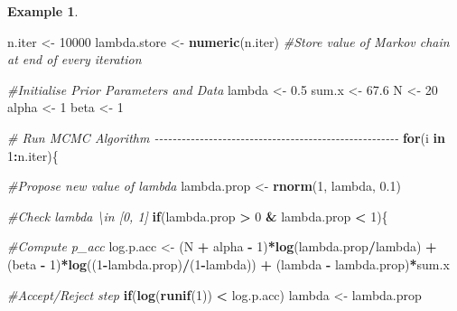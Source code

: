 \documentclass[
]{book}
\newenvironment{Shaded}{\begin{snugshade}}{\end{snugshade}}
\newcommand{\CommentTok}[1]{\textcolor[rgb]{0.56,0.35,0.01}{\textit{#1}}}
\newcommand{\ControlFlowTok}[1]{\textcolor[rgb]{0.13,0.29,0.53}{\textbf{#1}}}
\newcommand{\DecValTok}[1]{\textcolor[rgb]{0.00,0.00,0.81}{#1}}
\newcommand{\FloatTok}[1]{\textcolor[rgb]{0.00,0.00,0.81}{#1}}
\newcommand{\FunctionTok}[1]{\textcolor[rgb]{0.13,0.29,0.53}{\textbf{#1}}}
\newcommand{\NormalTok}[1]{#1}
\newcommand{\OtherTok}[1]{\textcolor[rgb]{0.56,0.35,0.01}{#1}}
\newcommand{\SpecialCharTok}[1]{\textcolor[rgb]{0.81,0.36,0.00}{\textbf{#1}}}
\theoremstyle{definition}
\theoremstyle{definition}
\newtheorem{example}{Example}[chapter]
\theoremstyle{definition}
\theoremstyle{definition}
\theoremstyle{remark}
\begin{document}
\begin{example}
\begin{Shaded}
\begin{Highlighting}[]
\NormalTok{n.iter }\OtherTok{\textless{}{-}} \DecValTok{10000}
\NormalTok{lambda.store }\OtherTok{\textless{}{-}} \FunctionTok{numeric}\NormalTok{(n.iter) }\CommentTok{\#Store value of Markov chain at end of every iteration}

\CommentTok{\#Initialise Prior Parameters and Data}
\NormalTok{lambda }\OtherTok{\textless{}{-}} \FloatTok{0.5}
\NormalTok{sum.x }\OtherTok{\textless{}{-}} \FloatTok{67.6}
\NormalTok{N }\OtherTok{\textless{}{-}} \DecValTok{20}
\NormalTok{alpha }\OtherTok{\textless{}{-}} \DecValTok{1}
\NormalTok{beta }\OtherTok{\textless{}{-}} \DecValTok{1}


\CommentTok{\# Run MCMC Algorithm {-}{-}{-}{-}{-}{-}{-}{-}{-}{-}{-}{-}{-}{-}{-}{-}{-}{-}{-}{-}{-}{-}{-}{-}{-}{-}{-}{-}{-}{-}{-}{-}{-}{-}{-}{-}{-}{-}{-}{-}{-}{-}{-}{-}{-}{-}{-}{-}{-}{-}{-}{-}{-}{-}}
\ControlFlowTok{for}\NormalTok{(i }\ControlFlowTok{in} \DecValTok{1}\SpecialCharTok{:}\NormalTok{n.iter)\{}
  
  \CommentTok{\#Propose new value of lambda}
\NormalTok{  lambda.prop }\OtherTok{\textless{}{-}} \FunctionTok{rnorm}\NormalTok{(}\DecValTok{1}\NormalTok{, lambda, }\FloatTok{0.1}\NormalTok{)}
  
  \CommentTok{\#Check lambda \textbackslash{}in [0, 1]}
  \ControlFlowTok{if}\NormalTok{(lambda.prop }\SpecialCharTok{\textgreater{}} \DecValTok{0} \SpecialCharTok{\&}\NormalTok{ lambda.prop }\SpecialCharTok{\textless{}} \DecValTok{1}\NormalTok{)\{}
    
    \CommentTok{\#Compute p\_acc}
\NormalTok{    log.p.acc }\OtherTok{\textless{}{-}}\NormalTok{ (N }\SpecialCharTok{+}\NormalTok{ alpha }\SpecialCharTok{{-}} \DecValTok{1}\NormalTok{)}\SpecialCharTok{*}\FunctionTok{log}\NormalTok{(lambda.prop}\SpecialCharTok{/}\NormalTok{lambda) }\SpecialCharTok{+} 
\NormalTok{      (beta }\SpecialCharTok{{-}} \DecValTok{1}\NormalTok{)}\SpecialCharTok{*}\FunctionTok{log}\NormalTok{((}\DecValTok{1}\SpecialCharTok{{-}}\NormalTok{lambda.prop)}\SpecialCharTok{/}\NormalTok{(}\DecValTok{1}\SpecialCharTok{{-}}\NormalTok{lambda)) }\SpecialCharTok{+}
\NormalTok{      (lambda }\SpecialCharTok{{-}}\NormalTok{ lambda.prop)}\SpecialCharTok{*}\NormalTok{sum.x}
    
    \CommentTok{\#Accept/Reject step}
    \ControlFlowTok{if}\NormalTok{(}\FunctionTok{log}\NormalTok{(}\FunctionTok{runif}\NormalTok{(}\DecValTok{1}\NormalTok{)) }\SpecialCharTok{\textless{}}\NormalTok{ log.p.acc)}
\NormalTok{      lambda }\OtherTok{\textless{}{-}}\NormalTok{ lambda.prop}
    

\end{Highlighting}
\end{Shaded}
\end{example}
\end{document}
